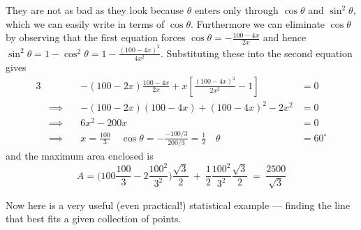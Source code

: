 \begin{eg}
They are not as bad as they look because $\theta$ enters only through
$\cos\theta$ and $\sin^2\theta$, which we can easily write in terms
of $\cos\theta$. Furthermore we can eliminate $\cos\theta$ by observing 
that the first equation forces $\cos\theta=-\frac{100-4x}{2x}$
and hence $\sin^2\theta=1-\cos^2\theta=1-\frac{(100-4x)^2}{4x^2}$. 
Substituting these into the second equation gives
\begin{alignat*}{3}
& & -(100-2x)\frac{100-4x}{2x}+x\left[\frac{(100-4x)^2}{2x^2}-1\right]&=0 \\[0.1in]
&\implies\quad & -(100-2x)(100-4x)+(100-4x)^2-2x^2&=0 \\[0.1in]
&\implies & 6x^2-200x&=0 \\[0.1in]
&\implies & x=\frac{100}{3}
\quad\cos\theta=-\frac{-100/3}{200/3}=\frac{1}{2}\quad
\theta&=60^\circ
\end{alignat*}
and the maximum area enclosed is
\begin{equation*}
A= \Big(100\frac{100}{3}-2\frac{100^2}{3^2}\Big)\frac{\sqrt{3}}{2}
           \ +\ \frac{1}{2} \frac{100^2}{3^2}\frac{\sqrt{3}}{2}
\ =\ \frac{2500}{\sqrt{3}}
\end{equation*}
\end{eg}

Now here is a very useful (even practical!) statistical example --- finding 
the line that best fits a given collection of points.

